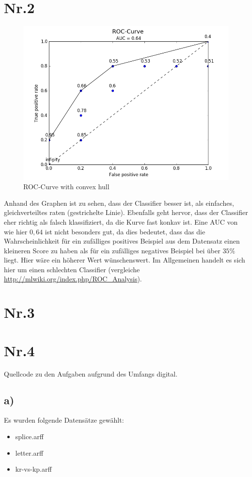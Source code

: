 \documentclass[a4paper,11pt,twoside]{article}
\begin{document}
\section*{Nr.2}
\begin{figure}[H]
	\centering
	\includegraphics[width=\textwidth]{images/figure_1.png}
	\caption{ROC-Curve with convex hull}
\end{figure}
Anhand des Graphen ist zu sehen, dass der Classifier besser ist, als einfaches, gleichverteiltes raten (gestrichelte Linie). Ebenfalls geht hervor, dass der Classifier eher richtig als falsch klassifiziert, da die Kurve fast konkav ist. Eine AUC von wie hier $0,64$ ist nicht besonders gut, da dies bedeutet, dass das die Wahrscheinlichkeit für ein zufälliges positives Beispiel aus dem Datensatz einen kleineren Score zu haben als für ein zufälliges negatives Beispiel bei über $35\%$ liegt. Hier wäre ein höherer Wert wünschenswert. Im Allgemeinen handelt es sich hier um einen schlechten Classifier (vergleiche \url{http://mlwiki.org/index.php/ROC_Analysis}).  
\pagebreak
\section*{Nr.3}



\section*{Nr.4}
Quellcode zu den Aufgaben aufgrund des Umfangs digital.
\subsection*{a)}
Es wurden folgende Datensätze gewählt:
\begin{itemize}
	\item splice.arff
	\item letter.arff
	\item kr-vs-kp.arff
\end{itemize}
\pagebreak
\end{document}
